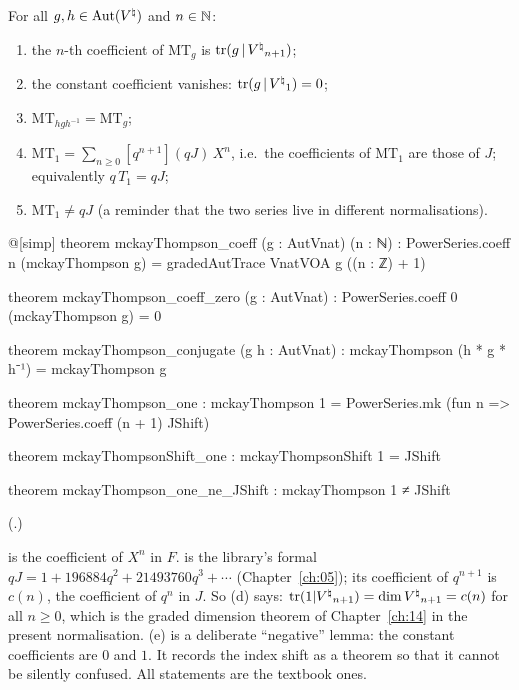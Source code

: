\begin{proposition}\label{ch16:prop:mtprops}
For all $g,h\in\operatorname{Aut}({V^{\natural}})$ and $n\in{\mathbb{N}}$:
\begin{enumerate}[label=(\alph*)]
\item the $n$-th coefficient of $\mathrm{MT}_g$ is $\operatorname{tr}(g\,|\,{V^{\natural}}_{n+1})$;
\item the constant coefficient vanishes: $\operatorname{tr}(g\,|\,{V^{\natural}}_1)=0$;
\item $\mathrm{MT}_{hgh^{-1}}=\mathrm{MT}_g$;
\item $\mathrm{MT}_1=\sum_{n\ge0}[q^{n+1}](qJ)\,X^n$, i.e.\ the coefficients of $\mathrm{MT}_1$ are those of $J$;
  equivalently $q\,T_1=qJ$;
\item $\mathrm{MT}_1\ne qJ$ (a reminder that the two series live in different normalisations).
\end{enumerate}
\end{proposition}
\begin{leancode}
@[simp] theorem mckayThompson_coeff (g : AutVnat) (n : ℕ) :
    PowerSeries.coeff n (mckayThompson g) =
      gradedAutTrace VnatVOA g ((n : ℤ) + 1)

theorem mckayThompson_coeff_zero (g : AutVnat) :
    PowerSeries.coeff 0 (mckayThompson g) = 0

theorem mckayThompson_conjugate (g h : AutVnat) :
    mckayThompson (h * g * h⁻¹) = mckayThompson g

theorem mckayThompson_one :
    mckayThompson 1 = PowerSeries.mk (fun n => PowerSeries.coeff (n + 1) JShift)

theorem mckayThompsonShift_one : mckayThompsonShift 1 = JShift

theorem mckayThompson_one_ne_JShift : mckayThompson 1 ≠ JShift
\end{leancode}
(.)
\begin{dictionary}
 is the coefficient of $X^n$ in $F$.   is the library's formal
$qJ=1+196884q^2+21493760q^3+\cdots$ (Chapter~\ref{ch:05}); its coefficient of $q^{n+1}$ is $c(n)$, the coefficient
of $q^n$ in $J$.  So (d) says: $\operatorname{tr}(1|{V^{\natural}}_{n+1})=\dim{V^{\natural}}_{n+1}=c(n)$ for all $n\ge0$, which is the graded
dimension theorem of Chapter~\ref{ch:14} in the present normalisation.  (e) is a deliberate ``negative'' lemma: the
constant coefficients are $0$ and $1$.  It records the index shift as a theorem so that it cannot be silently
confused.  All statements are the textbook ones.
\end{dictionary}
